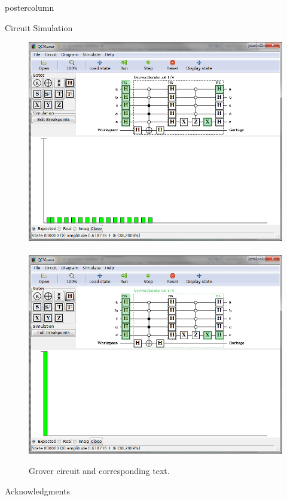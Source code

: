 \documentclass[final]{beamer} %
\begin{document}
\begin{frame}{}
\begin{columns}
\begin{column}{.33\textwidth}
\begin{beamercolorbox}[center,wd=\textwidth]{postercolumn}
\begin{minipage}[T]{.95\textwidth}
\begin{block}{\large Circuit Simulation}
\begin{figure}[!htbp]
		            \includegraphics[width=7in]{figures/Grover_Simulate1.png} \ \  \includegraphics[width=7in]{figures/Grover_Simulate2.png}
		            \caption{Grover circuit and corresponding text.}
		        \end{figure}
            \end{block}
            \begin{block}{\large Acknowledgments}
                \begin{center}

\end{center}
\end{block}
\end{minipage}
\end{beamercolorbox}
\end{column}
\end{columns}
\end{frame}
\end{document}
